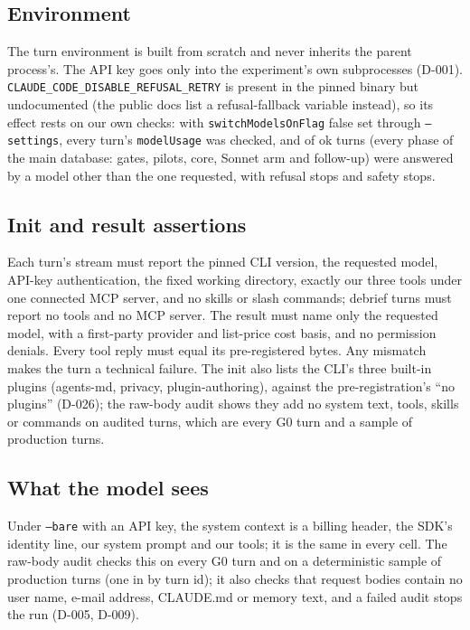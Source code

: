 \subsection{Environment}
The turn environment is built from scratch and never inherits the parent process's.
The API key goes only into the experiment's own subprocesses (D-001).
\texttt{CLAUDE\_CODE\_DISABLE\_REFUSAL\_RETRY} is present in the pinned \wtthDesignCliVersion{} binary but undocumented (the public docs list a refusal-fallback variable instead), so its effect rests on our own checks: with \texttt{switchModelsOnFlag} false set through \texttt{--settings}, every turn's \texttt{modelUsage} was checked, and of \wtthTurnIntegrityOkN{} ok turns (every phase of the main database: gates, pilots, core, Sonnet arm and follow-up) \wtthTurnIntegrityOkOtherModelK{} were answered by a model other than the one requested, with \wtthTurnIntegrityRefusalStopK{} refusal stops and \wtthTurnIntegritySafetyStopK{} safety stops.
\begin{center}\scriptsize

\end{center}

\subsection{Init and result assertions}
Each turn's stream must report the pinned CLI version, the requested model, API-key authentication, the fixed working directory, exactly our three tools under one connected MCP server, and no skills or slash commands; debrief turns must report no tools and no MCP server.
The result must name only the requested model, with a first-party provider and list-price cost basis, and no permission denials.
Every tool reply must equal its pre-registered bytes.
Any mismatch makes the turn a technical failure.
The init also lists the CLI's three built-in plugins (agents-md, privacy, plugin-authoring), against the pre-registration's ``no plugins'' (D-026); the raw-body audit shows they add no system text, tools, skills or commands on audited turns, which are every G0 turn and a sample of production turns.

\subsection{What the model sees}
Under \texttt{--bare} with an API key, the system context is a billing header, the SDK's identity line, our system prompt and our tools; it is the same in every cell.
The raw-body audit checks this on every G0 turn and on a deterministic sample of production turns (one in \wtthDesignAuditSampleMod{} by turn id); it also checks that request bodies contain no user name, e-mail address, CLAUDE.md or memory text, and a failed audit stops the run (D-005, D-009).

